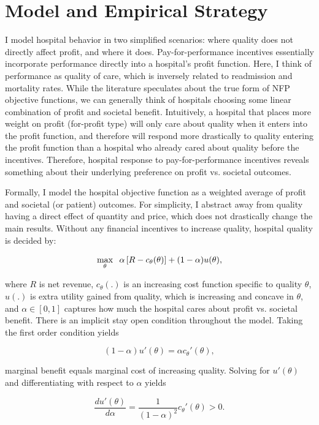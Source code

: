 \documentclass[12pt]{article}
\begin{document}
    \section{Model and Empirical Strategy}\label{sec:model}

    I model hospital behavior in two simplified scenarios: where quality does not directly affect profit, and where it does. Pay-for-performance incentives essentially incorporate performance directly into a hospital's profit function. Here, I think of performance as quality of care, which is inversely related to readmission and mortality rates. While the literature speculates about the true form of NFP objective functions, we can generally think of hospitals choosing some linear combination of profit and societal benefit. Intuitively, a hospital that places more weight on profit (for-profit type) will only care about quality when it enters into the profit function, and therefore will respond more drastically to quality entering the profit function than a hospital who already cared about quality before the incentives. Therefore, hospital response to pay-for-performance incentives reveals something about their underlying preference on profit vs. societal outcomes. 

    Formally, I model the hospital objective function as a weighted average of profit and societal (or patient) outcomes. For simplicity, I abstract away from quality having a direct effect of quantity and price, which does not drastically change the main results. Without any financial incentives to increase quality, hospital quality is decided by:  
    
    $$\max_{\theta}\hspace{2mm}\alpha\left[R - c_{\theta}(\theta) \right] + (1-\alpha) u(\theta),$$

    \noindent where $R$ is net revenue, $c_{\theta}(.)$ is an increasing cost function specific to quality $\theta$, $u(.)$ is extra utility gained from quality, which is increasing and concave in $\theta$, and $\alpha\in[0,1]$ captures how much the hospital cares about profit vs. societal benefit. There is an implicit stay open condition throughout the model. Taking the first order condition yields 

    $$(1-\alpha)u'(\theta) = \alpha c_{\theta}'(\theta),$$

    \noindent marginal benefit equals marginal cost of increasing quality. Solving for $u'(\theta)$ and differentiating with respect to $\alpha$ yields

    $$\frac{du'(\theta)}{d\alpha} = \frac{1}{(1-\alpha)^2}c_{\theta}'(\theta) > 0.$$
\end{document}

